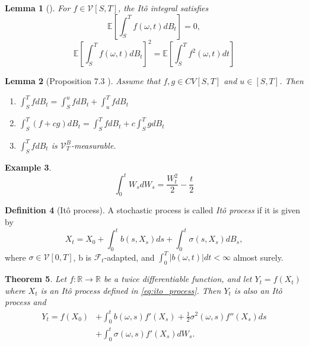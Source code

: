 \documentclass[12pt]{article}
\newtheorem{theorem}{Theorem}[section]
\newtheorem{lemma}[theorem]{Lemma}
\theoremstyle{definition}
\newtheorem{definition}[theorem]{Definition}
\newtheorem{example}[theorem]{Example}
\numberwithin{equation}{section}
\newcommand{\R}{\mathbb{R}}
\newcommand{\E}{\mathbb{E}}
\newcommand{\CF}{\mathcal{F}}
\newcommand{\CV}{\mathcal{V}}
\begin{document}
\begin{lemma}[\autocite{eAppliedStochasticAnalysis2021}]
  For $f \in \CV[S,T]$, the Itô integral satisfies
  \begin{equation}
    \E \left[ \int_S^T f(\omega,t)dB_t \right] = 0,
  \end{equation}
  \begin{equation}
    \E \left[ \int_S^T f(\omega,t)dB_t \right]^2 = \E \left[ \int_S^T f^2(\omega,t)dt \right]
  \end{equation}
\end{lemma}
\begin{lemma}[Proposition 7.3 ]
  Assume that $f,g \in CV[S,T]$ and $u \in [S,T]$. Then
  \begin{enumerate}
    \item $\int_S^TfdB_t = \int_S^ufdB_t + \int_u^TfdB_t$
    \item $\int_S^T(f+cg)dB_t =  \int_S^TfdB_t + c \int_S^TgdB_t$
    \item $\int_S^TfdB_t$ is $\CV_T^B$-measurable.
  \end{enumerate}
\end{lemma}
\begin{example}
  \begin{equation}
    \int_0^t W_s dW_s = \frac{W_t^2}{2} - \frac{t}{2}
  \end{equation}
\end{example}
\begin{definition}[Itô process]
  A stochastic process is called \emph{Itô process} if it is given by
  \begin{equation}
    \label{eq:ito_process}
    X_t = X_0 + \int_0^tb(s, X_s)ds + \int_0^t \sigma(s, X_s)dB_s,
  \end{equation}
  where $\sigma \in \CV[0,T]$, b is $\CF_t$-adapted, and $\int_0^T |b(\omega,t)|dt < \infty$ almost surely.
\end{definition}
\begin{theorem}
  Let $f : \R \rightarrow \R$ be a twice differentiable function, and let $Y_t = f(X_t)$ where $X_t$ is an Itô process defined in \eqref{eq:ito_process}. Then $Y_t$ is also an Itô process and
  \begin{equation}
    \begin{split}
    Y_t = f(X_0) &+ \int_0^t b(\omega,s)f'(X_s) + \frac{1}{2}\sigma^2(\omega,s)f''(X_s)ds \\
    &+ \int_0^t \sigma(\omega, s)f'(X_s)dW_s.
    \end{split}
  \end{equation}
\end{theorem}
\end{document}
